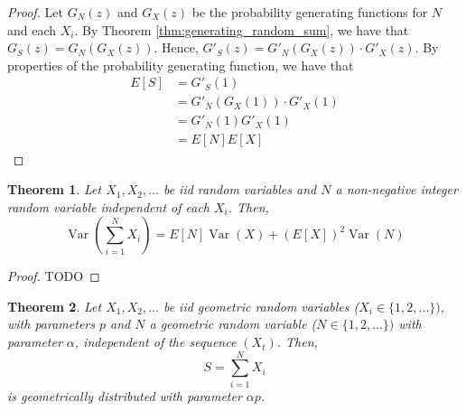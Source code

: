 \documentclass{article}
\theoremstyle{plain}
\newtheorem{theorem}{Theorem}[section]
\theoremstyle{definition}
\theoremstyle{remark}
\newcommand{\Var}{\operatorname {Var}}
\begin{document}
\begin{proof}
Let $G_N(z)$ and $G_X(z)$ be the probability generating functions for $N$ and each $X_i$.
By Theorem \ref{thm:generating_random_sum}, we have that $G_S(z) = G_N(G_X(z))$.
Hence,
$G'_S(z) = G'_N(G_X(z)) \cdot G'_X(z)$.
By properties of the probability generating function, we have that
\begin{align*}
    E[S] &= G'_S(1)\\
    &= G'_N(G_X(1)) \cdot G'_X(1)\\
    &= G'_N(1) G'_X(1)\\
    &= E[N] E[X]
\end{align*}

\end{proof}

\begin{theorem} \label{thm:random_sum_var}
Let $X_1, X_2, \ldots$ be iid random variables and $N$ a non-negative integer random variable independent of each $X_i$.
Then,
$$
\Var\left( \sum_{i = 1}^N X_i \right) = E[N]\Var(X) + (E[X])^2 \Var(N)
$$
\end{theorem}

\begin{proof}
TODO
\end{proof}

\begin{theorem}\label{thm:geom_sum_geom}
Let $X_1, X_2, \ldots$ be iid geometric random variables ($X_i \in \{1,2,\ldots\})$, with parameters $p$ and $N$ a geometric random variable ($N \in \{1,2,\ldots\})$ with parameter $\alpha$, independent of the sequence $(X_t)$.
Then,
$$
S = \sum_{i = 1}^N X_i
$$
is geometrically distributed with parameter $\alpha p$.
\end{theorem}
\end{document}
